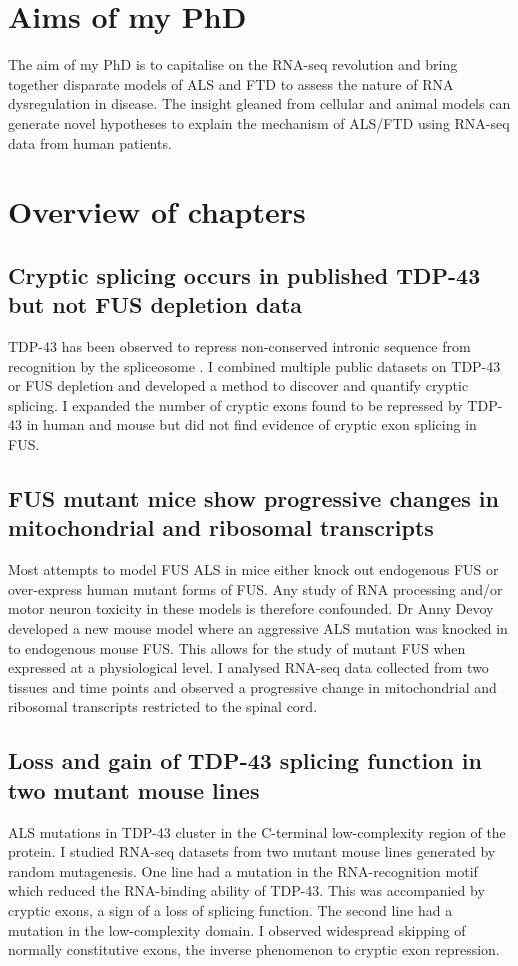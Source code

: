 \section{Aims of my PhD} %

The aim of my PhD is to capitalise on the RNA-seq revolution and bring together disparate models of ALS and FTD to assess the nature of RNA dysregulation in disease.
The insight gleaned from cellular and animal models can generate novel hypotheses to explain the mechanism of ALS/FTD using RNA-seq data from human patients.

\section{Overview of chapters}

\subsection{Cryptic splicing occurs in published TDP-43 but not FUS depletion data}
TDP-43 has been observed to repress non-conserved intronic sequence from recognition by the spliceosome \citep{Ling2015}. 
I combined multiple public datasets on TDP-43 or FUS depletion and developed a method to discover and quantify cryptic splicing.
I expanded the number of cryptic exons found to be repressed by TDP-43 in human and mouse but did not find evidence of cryptic exon splicing in FUS.

\subsection{FUS mutant mice show progressive changes in mitochondrial and ribosomal transcripts}
Most attempts to model FUS ALS in mice either knock out endogenous FUS or over-express human mutant forms of FUS. 
Any study of RNA processing and/or motor neuron toxicity in these models is therefore confounded.
Dr Anny Devoy developed a new mouse model where an aggressive ALS mutation was knocked in to endogenous mouse FUS. 
This allows for the study of mutant FUS when expressed at a physiological level. 
I analysed RNA-seq data collected from two tissues and time points and observed a progressive change in mitochondrial and ribosomal transcripts restricted to the spinal cord.

\subsection{Loss and gain of TDP-43 splicing function in two mutant mouse lines}
ALS mutations in TDP-43 cluster in the C-terminal low-complexity region of the protein.
I studied RNA-seq datasets from two mutant mouse lines generated by random mutagenesis. 
One line had a mutation in the RNA-recognition motif which reduced the RNA-binding ability of TDP-43.
This was accompanied by cryptic exons, a sign of a loss of splicing function.
The second line had a mutation in the low-complexity domain.
I observed widespread skipping of normally constitutive exons, the inverse phenomenon to cryptic exon repression.


